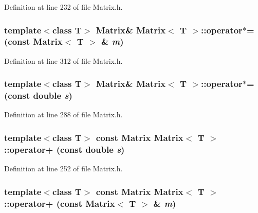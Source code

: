 Definition at line 232 of file Matrix.h.

\hypertarget{classMatrix_a3226c4b1a3ffb1090a7434806ad2ef03}{
\subsubsection[{operator$\ast$=}]{\setlength{\rightskip}{0pt plus 5cm}template$<$class T$>$ {\bf Matrix}\& {\bf Matrix}$<$ T $>$::operator$\ast$= (const {\bf Matrix}$<$ T $>$ \& {\em m})}}
\label{classMatrix_a3226c4b1a3ffb1090a7434806ad2ef03}


Definition at line 312 of file Matrix.h.

\hypertarget{classMatrix_a8079792abad8b038cd795a339ce9747b}{
\subsubsection[{operator$\ast$=}]{\setlength{\rightskip}{0pt plus 5cm}template$<$class T$>$ {\bf Matrix}\& {\bf Matrix}$<$ T $>$::operator$\ast$= (const double {\em s})}}
\label{classMatrix_a8079792abad8b038cd795a339ce9747b}


Definition at line 288 of file Matrix.h.

\hypertarget{classMatrix_a3c70791a9bb45afff8d0ea23601e3203}{
\subsubsection[{operator+}]{\setlength{\rightskip}{0pt plus 5cm}template$<$class T$>$ const {\bf Matrix} {\bf Matrix}$<$ T $>$::operator+ (const double {\em s})}}
\label{classMatrix_a3c70791a9bb45afff8d0ea23601e3203}


Definition at line 252 of file Matrix.h.

\hypertarget{classMatrix_a311f3649e41cb4a3155f3f71a65829cb}{
\subsubsection[{operator+}]{\setlength{\rightskip}{0pt plus 5cm}template$<$class T$>$ const {\bf Matrix} {\bf Matrix}$<$ T $>$::operator+ (const {\bf Matrix}$<$ T $>$ \& {\em m})}}
\label{classMatrix_a311f3649e41cb4a3155f3f71a65829cb}


